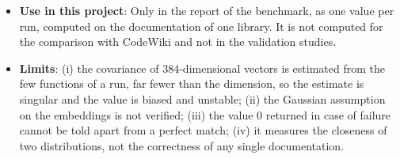 \begin{itemize}[leftmargin=*, label=\textbullet]
	\item \textbf{Use in this project}: Only in the report of the benchmark, as one value per run,
	computed on the documentation of one library. It is not computed for the comparison with CodeWiki
	and not in the validation studies.

	\item \textbf{Limits}: (i) the covariance of $384$-dimensional vectors is estimated from the few
	functions of a run, far fewer than the dimension, so the estimate is singular and the value is
	biased and unstable; (ii) the Gaussian assumption on the embeddings is not verified; (iii) the
	value $0$ returned in case of failure cannot be told apart from a perfect match; (iv) it measures
	the closeness of two distributions, not the correctness of any single documentation.
\end{itemize}


